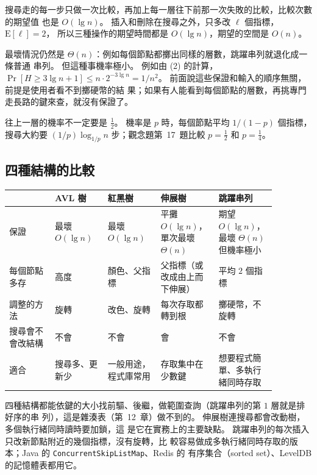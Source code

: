 搜尋走的每一步只做一次比較，再加上每一層往下前那一次失敗的比較，比較次數的期望值
也是 $O(\lg n)$。 插入和刪除在搜尋之外，只多改 $\ell$ 個指標，$\mathrm{E}[\ell] = 2$，
所以三種操作的期望時間都是 $O(\lg n)$，期望的空間是 $O(n)$。

最壞情況仍然是 $\Theta(n)$：例如每個節點都擲出同樣的層數，跳躍串列就退化成一條普通
串列。 但這種事機率極小。 例如由 (2) 的計算，$\Pr[H \ge 3 \lg n + 1] \le n \cdot
2^{-3\lg n} = 1/n^2$。 前面說這些保證和輸入的順序無關，前提是使用者看不到擲硬幣的結
果；如果有人能看到每個節點的層數，再挑專門走長路的鍵來查，就沒有保證了。

往上一層的機率不一定要是 $\frac12$。 機率是 $p$ 時，每個節點平均 $1/(1-p)$ 個指標，
搜尋大約要 $(1/p)\log_{1/p} n$ 步；觀念題第~17~題比較 $p = \frac12$ 和 $p = \frac14$。

\subsection{四種結構的比較}
\label{sec:bal-skip-compare}

\begin{center}
\small
\begin{tabular}{p{0.15\linewidth}p{0.17\linewidth}p{0.17\linewidth}p{0.19\linewidth}p{0.19\linewidth}}
\toprule
 & AVL 樹 & 紅黑樹 & 伸展樹 & 跳躍串列 \\
\midrule
保證 & 最壞 $O(\lg n)$ & 最壞 $O(\lg n)$ & 平攤 $O(\lg n)$，單次最壞 $\Theta(n)$ &
期望 $O(\lg n)$，最壞 $\Theta(n)$ 但機率極小 \\
每個節點多存 & 高度 & 顏色、父指標 & 父指標（或改成由上而下伸展） & 平均 $2$ 個指標 \\
調整的方法 & 旋轉 & 改色、旋轉 & 每次存取都轉到根 & 擲硬幣，不旋轉 \\
搜尋會不會改結構 & 不會 & 不會 & 會 & 不會 \\
適合 & 搜尋多、更新少 & 一般用途，程式庫常用 & 存取集中在少數鍵 & 想要程式簡單、多執行緒同時存取 \\
\bottomrule
\end{tabular}
\end{center}

四種結構都能依鍵的大小找前驅、後繼，做範圍查詢（跳躍串列的第 $1$ 層就是排好序的串
列），這是雜湊表（第~12~章）做不到的。 伸展樹連搜尋都會改動樹，多個執行緒同時讀時要加鎖，這
是它在實務上的主要缺點。 跳躍串列的每次插入只改新節點附近的幾個指標，沒有旋轉，比
較容易做成多執行緒同時存取的版本；Java 的 \texttt{ConcurrentSkipListMap}、Redis 的
有序集合（sorted set）、LevelDB 的記憶體表都用它。

